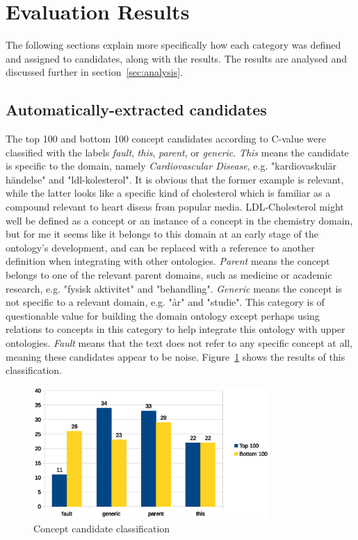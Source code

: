 \documentclass[a4paper]{report}
\begin{document}
\section{Evaluation Results}

The following sections explain more specifically how each category was defined and assigned to candidates, along with the results.
The results are analysed and discussed further in section~\ref{sec:analysis}.

\subsection{Automatically-extracted candidates}
\label{sec:results:eval:cands}

The top 100 and bottom 100 concept candidates according to C-value were classified with the labels \emph{fault}, \emph{this}, \emph{parent}, or \emph{generic}.
\emph{This} means the candidate is specific to the domain, namely \emph{Cardiovascular Disease}, e.g. "kardiovaskulär händelse" and "ldl-kolesterol".
It is obvious that the former example is relevant, while the latter looks like a specific kind of cholesterol which is familiar as a compound relevant to heart diseas from popular media.
LDL-Cholesterol might well be defined as a concept or an instance of a concept in the chemistry domain, but for me it seems like it belongs to this domain at an early stage of the ontology's development, and can be replaced with a reference to another definition when integrating with other ontologies.
\emph{Parent} means the concept belongs to one of the relevant parent domains, such as medicine or academic research, e.g. "fysisk aktivitet" and "behandling".
\emph{Generic} means the concept is not specific to a relevant domain, e.g. "år" and "studie".
This category is of questionable value for building the domain ontology except perhaps using relations to concepts in this category to help integrate this ontology with upper ontologies.
\emph{Fault} means that the text does not refer to any specific concept at all, meaning these candidates appear to be noise.
Figure~\ref{fig:concept-cands} shows the results of this classification.

\begin{figure}
  \centering
  \includegraphics[width=0.8\textwidth]{graphics/concepts.eps}
  \caption{Concept candidate classification}
  \label{fig:concept-cands}
\end{figure}
\end{document}
